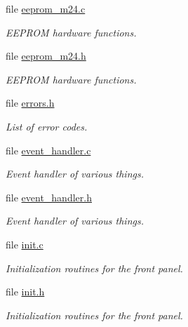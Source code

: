 \begin{CompactItemize}
\item 
file \hyperlink{eeprom__m24_8c}{eeprom\_\-m24.c}
\begin{CompactList}\small\item\em EEPROM hardware functions. \item\end{CompactList}

\item 
file \hyperlink{eeprom__m24_8h}{eeprom\_\-m24.h}
\begin{CompactList}\small\item\em EEPROM hardware functions. \item\end{CompactList}

\item 
file \hyperlink{errors_8h}{errors.h}
\begin{CompactList}\small\item\em List of error codes. \item\end{CompactList}

\item 
file \hyperlink{event__handler_8c}{event\_\-handler.c}
\begin{CompactList}\small\item\em Event handler of various things. \item\end{CompactList}

\item 
file \hyperlink{event__handler_8h}{event\_\-handler.h}
\begin{CompactList}\small\item\em Event handler of various things. \item\end{CompactList}

\item 
file \hyperlink{front__panel_2init_8c}{init.c}
\begin{CompactList}\small\item\em Initialization routines for the front panel. \item\end{CompactList}

\item 
file \hyperlink{front__panel_2init_8h}{init.h}
\begin{CompactList}\small\item\em Initialization routines for the front panel. \item\end{CompactList}


\end{CompactItemize}
